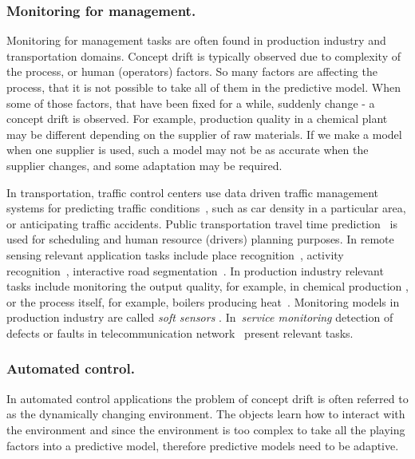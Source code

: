 \documentclass{llncs}
\begin{document}
\subsubsection{Monitoring for management.}

Monitoring for management tasks are often  found in production industry and transportation domains.
Concept drift is typically observed due to complexity of the process, or human (operators) factors. So many factors are affecting the process, that it is not possible to take all of them in the predictive model. When some of those factors, that have been fixed for a while, suddenly change - a concept drift is observed. For example, production quality in a chemical plant may be different depending on the supplier of raw materials. If we make a model when one supplier is used, such a model may not be as accurate when the supplier changes, and some adaptation may be required.

In transportation, traffic control centers use data driven traffic management systems for predicting traffic conditions~\cite{Crespo05}, such as car density in a particular area, or anticipating traffic accidents.
Public transportation travel time prediction~\cite{Moreira08} is used for scheduling and human resource (drivers) planning purposes.
In remote sensing relevant application tasks include place recognition~\cite{Luo07}, activity recognition~\cite{Liao07},
interactive road segmentation~\cite{Zhou08}.
In production industry relevant tasks include monitoring the output quality, for example, in chemical production \cite{Kadlec11ache}, or the process itself, for example, boilers producing heat~\cite{PechenizkiySIGKDDExpl09}.
Monitoring models in production industry are called \emph{soft sensors} \cite{Kadlec11}.
In~\emph{service monitoring} detection of defects or faults in telecommunication network~\cite{Pawling07} present relevant tasks.

\subsubsection{Automated control.}

In automated control applications the problem of concept drift is often referred to as the dynamically changing environment.
The objects learn how to interact with the environment and since the environment is too complex to take all the playing factors into a predictive model, therefore predictive models need to be adaptive.
\end{document}
